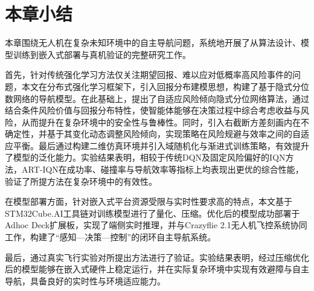\section{本章小结}

本章围绕无人机在复杂未知环境中的自主导航问题，系统地开展了从算法设计、模型训练到嵌入式部署与真机验证的完整研究工作。

首先，针对传统强化学习方法仅关注期望回报、难以应对低概率高风险事件的问题，本文在分布式强化学习框架下，引入回报分布建模思想，构建了基于隐式分位数网络的导航模型。在此基础上，提出了自适应风险倾向隐式分位网络算法，通过结合条件风险价值与回报分布特性，使智能体能够在决策过程中综合考虑收益与风险，从而提升在复杂环境中的安全性与鲁棒性。同时，引入右截断方差刻画内在不确定性，并基于其变化动态调整风险倾向，实现策略在风险规避与效率之间的自适应平衡。最后通过构建二维仿真环境并引入域随机化与渐进式训练策略，有效提升了模型的泛化能力。实验结果表明，相较于传统DQN及固定风险偏好的IQN方法，ART-IQN在成功率、碰撞率与导航效率等指标上均表现出更优的综合性能，验证了所提方法在复杂环境中的有效性。

在模型部署方面，针对嵌入式平台资源受限与实时性要求高的特点，本文基于STM32Cube.AI工具链对训练模型进行了量化、压缩。优化后的模型成功部署于Adhoc Deck扩展板，实现了端侧实时推理，并与Crazyflie 2.1无人机飞控系统协同工作，构建了“感知—决策—控制”的闭环自主导航系统。

最后，通过真实飞行实验对所提出方法进行了验证。实验结果表明，经过压缩优化后的模型能够在嵌入式硬件上稳定运行，并在实际复杂环境中实现有效避障与自主导航，具备良好的实时性与环境适应能力。


